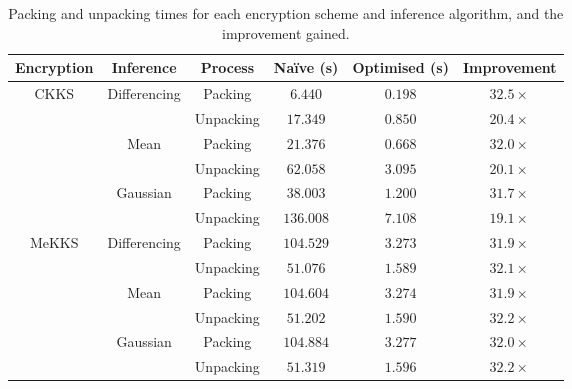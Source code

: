 \begin{table}[h!]
    \centering
    \begin{tabular}{|c|c|c|c|c|c|}
        \hline
        \textrm{\textbf{Encryption}} & \textrm{\textbf{Inference}} & \textrm{\textbf{Process}} & \textrm{\textbf{Na\"ive} (s)} & \textrm{\textbf{Optimised} (s)} & \textrm{\textbf{Improvement}}
        \\ \hline \hline
        \multirow{6}{*}{\textrm{CKKS}}  & \multirow{2}{*}{\textrm{Differencing}} & \textrm{Packing}   & $6.440$ & $0.198$ & $32.5 \times$
        \\ \cline{3-6} 
                                        &                                        & \textrm{Unpacking} & $17.349$ & $0.850$ & $20.4 \times$
        \\ \cline{2-6} 
                                        & \multirow{2}{*}{\textrm{Mean}}         & \textrm{Packing}   & $21.376$ & $0.668$ & $32.0 \times$
        \\ \cline{3-6} 
                                        &                                        & \textrm{Unpacking} & $62.058$ & $3.095$ & $20.1 \times$
        \\ \cline{2-6} 
                                        & \multirow{2}{*}{\textrm{Gaussian}}     & \textrm{Packing}   & $38.003$ & $1.200$ & $31.7 \times$
        \\ \cline{3-6} 
                                        &                                        & \textrm{Unpacking} & $136.008$ & $7.108$ & $19.1 \times$
        \\ \hline
        \multirow{6}{*}{\textrm{MeKKS}} & \multirow{2}{*}{\textrm{Differencing}} & \textrm{Packing}   & $104.529$ & $3.273$ & $31.9 \times$
        \\ \cline{3-6} 
                                        &                                        & \textrm{Unpacking} & $51.076$ & $1.589$ & $32.1 \times$
        \\ \cline{2-6} 
                                        & \multirow{2}{*}{\textrm{Mean}}         & \textrm{Packing}   & $104.604$ & $3.274$ & $31.9 \times$
        \\ \cline{3-6} 
                                        &                                        & \textrm{Unpacking} & $51.202$ & $1.590$ & $32.2 \times$
        \\ \cline{2-6} 
                                        & \multirow{2}{*}{\textrm{Gaussian}}     & \textrm{Packing}   & $104.884$ & $3.277$ & $32.0 \times$
        \\ \cline{3-6} 
                                        &                                        & \textrm{Unpacking} & $51.319$ & $1.596$ & $32.2 \times$
        \\ \hline
    \end{tabular}%
    \caption[Packing and Unpacking Improvements]{Packing and unpacking times for each encryption scheme and inference algorithm, and the improvement gained.}
    \label{tab:packingAndUnpacking}
\end{table}

